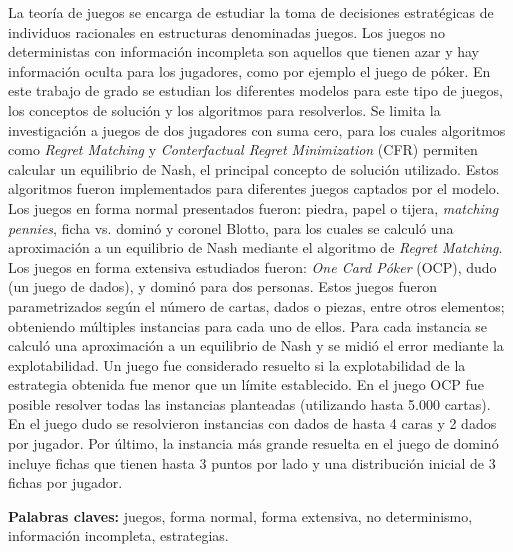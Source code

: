 \begin{resumen}
    La teoría de juegos se encarga de estudiar la toma de decisiones estratégicas de individuos racionales en estructuras denominadas juegos. Los juegos no deterministas con información incompleta son aquellos que tienen azar y hay información oculta para los jugadores, como por ejemplo el juego de póker. En este trabajo de grado se estudian los diferentes modelos para este tipo de juegos, los conceptos de solución y los algoritmos para resolverlos. Se limita la investigación a juegos de dos jugadores con suma cero, para los cuales algoritmos como \textit{Regret Matching} y \textit{Conterfactual Regret Minimization} (CFR) permiten calcular un equilibrio de Nash, el principal concepto de solución utilizado. Estos algoritmos fueron implementados para diferentes juegos captados por el modelo. Los juegos en forma normal presentados fueron: piedra, papel o tijera, \textit{matching pennies}, ficha vs. dominó y coronel Blotto, para los cuales se calculó una aproximación a un equilibrio de Nash mediante el algoritmo de \textit{Regret Matching}. Los juegos en forma extensiva estudiados fueron: \textit{One Card Póker} (OCP), dudo (un juego de dados), y dominó para dos personas. Estos juegos fueron parametrizados según el número de cartas, dados o piezas, entre otros elementos; obteniendo múltiples instancias para cada uno de ellos. Para cada instancia se calculó una aproximación a un equilibrio de Nash y se midió el error mediante la explotabilidad. Un juego fue considerado resuelto si la explotabilidad de la estrategia obtenida fue menor que un límite establecido. En el juego OCP fue posible resolver todas las instancias planteadas (utilizando hasta 5.000 cartas). En el juego dudo se resolvieron instancias con dados de hasta 4 caras y 2 dados por jugador. Por último, la instancia más grande resuelta en el juego de dominó incluye fichas que tienen hasta 3 puntos por lado y una distribución inicial de 3 fichas por jugador.
    
    \vfill
    \textbf{Palabras claves:} juegos, forma normal, forma extensiva, no determinismo, información incompleta, estrategias.
\end{resumen}